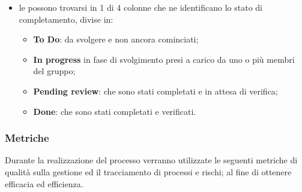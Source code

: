 \begin{itemize}
		\item le  possono trovarsi in 1 di 4 colonne che ne identificano lo stato di completamento, divise in:
		\begin{itemize}
			\item \textbf{To Do}:  da svolgere e non ancora cominciati;
			\item \textbf{In progress}  in fase di svolgimento presi a carico da uno o più membri del gruppo;
			\item \textbf{Pending review}:  che sono stati completati e in attesa di verifica;
			\item \textbf{Done}:  che sono stati completati e verificati.
		\end{itemize}
	\end{itemize}

	\subsubsection{Metriche}
	Durante la realizzazione del processo verranno utilizzate le seguenti metriche di qualità sulla gestione ed il tracciamento di processi e rischi; al fine di ottenere efficacia ed efficienza.


